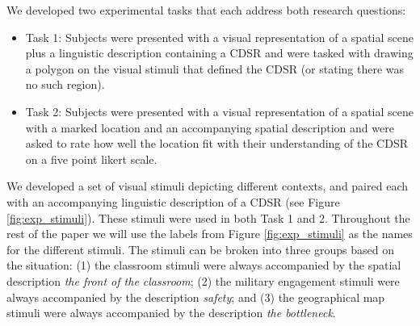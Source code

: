 \documentclass[11pt,letterpaper]{article}
\begin{document}

We developed two experimental tasks that each address both research questions:
\begin{itemize}
	\item{Task 1:} Subjects were presented with a visual representation of a spatial scene plus a linguistic description containing a CDSR and were tasked with drawing a polygon on the visual stimuli that defined the CDSR (or stating there was no such region).
	\item{Task 2:} Subjects were presented with a visual representation of a spatial scene with a marked location and an accompanying spatial description and were asked to rate how well the location fit with their understanding of the CDSR on a five point likert scale.
\end{itemize}

We developed a set of visual stimuli depicting different contexts, and paired each with an accompanying linguistic description of a CDSR (see Figure \ref{fig:exp_stimuli}). These stimuli were used in both Task 1 and 2. Throughout the rest of the paper we will use the labels from Figure \ref{fig:exp_stimuli} as the names for the different stimuli. The stimuli can be broken into three groups based on the situation: (1) the classroom stimuli were always accompanied by the spatial description \emph{the front of the classroom}; (2) the military engagement stimuli were always accompanied by the description \emph{safety}; and (3) the geographical map stimuli were always accompanied by the description \emph{the bottleneck}.
\end{document}
